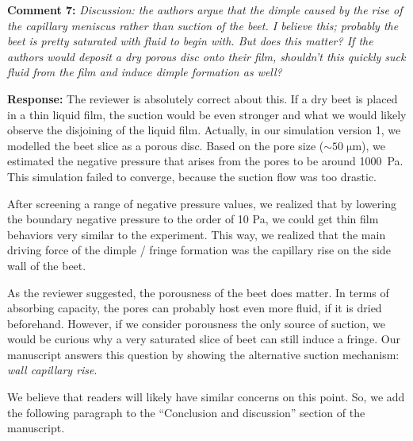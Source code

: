 \documentclass[11pt]{article}
\begin{document}
\bigskip
\begin{siderules}
\textbf{Comment 7:} \textit{Discussion: the authors argue that the dimple caused by the rise of the capillary meniscus rather than suction of the beet. I believe this; probably the beet is pretty saturated with fluid to begin with. But does this matter? If the authors would deposit a dry porous disc onto their film, shouldn’t this quickly suck fluid from the film and induce dimple formation as well?}
\end{siderules}

\textbf{Response:} The reviewer is absolutely correct about this. If a dry beet is placed in a thin liquid film, the suction would be even stronger and what we would likely observe the disjoining of the liquid film. 
Actually, in our simulation version 1, we modelled the beet slice as a porous disc.
Based on the pore size ($\sim 50\;\mathrm{\mu m}$), we estimated the negative pressure that arises from the pores to be around 1000~Pa. 
This simulation failed to converge, because the suction flow was too drastic.

After screening a range of negative pressure values, we realized that by lowering the boundary negative pressure to the order of 10 Pa, we could get thin film behaviors very similar to the experiment. 
This way, we realized that the main driving force of the dimple / fringe formation was the capillary rise on the side wall of the beet. 

As the reviewer suggested, the porousness of the beet does matter. In terms of absorbing capacity, the pores can probably host even more fluid, if it is dried beforehand. However, if we consider porousness the only source of suction, we would be curious why a very saturated slice of beet can still induce a fringe. Our manuscript answers this question by showing the alternative suction mechanism: \emph{wall capillary rise}.

We believe that readers will likely have similar concerns on this point. So, we add the following paragraph to the ``Conclusion and discussion'' section of the manuscript. 
\end{document}

